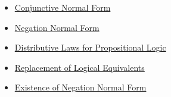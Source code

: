 \begin{dependencies}
\begin{itemize}
  \item \hyperref[def:conjunctive-normal-form-propositional-logic]{Conjunctive Normal Form}
  \item \hyperref[def:negation-normal-form-propositional-logic]{Negation Normal Form}
  \item \hyperref[thm:distributive-laws-propositional-logic]{Distributive Laws for Propositional Logic}
  \item \hyperref[thm:replacement-of-logical-equivalents-propositional-logic]{Replacement of Logical Equivalents}
  \item \hyperref[thm:existence-negation-normal-form-propositional-logic]{Existence of Negation Normal Form}
\end{itemize}
\end{dependencies}

